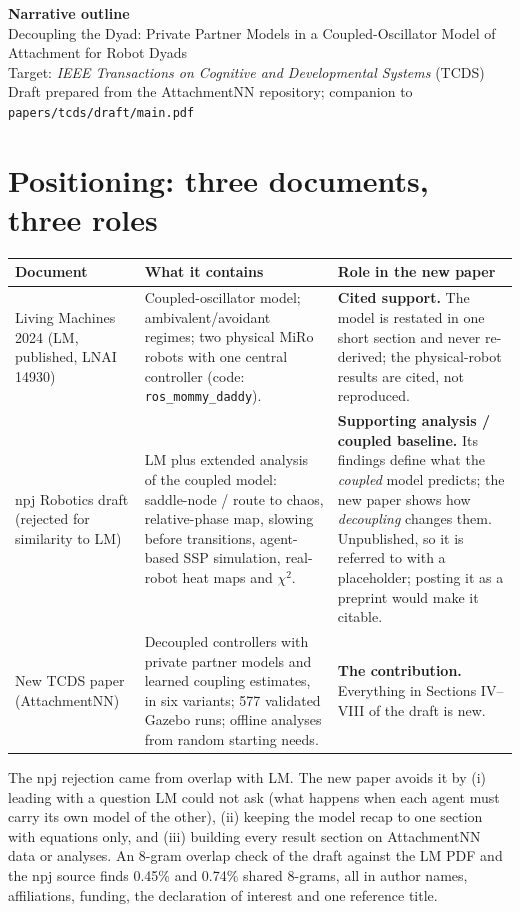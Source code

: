 \documentclass[10pt,a4paper]{article}
\begin{document}
\begin{center}
{\LARGE\bfseries Narrative outline}\\[4pt]
{\large Decoupling the Dyad: Private Partner Models in a Coupled-Oscillator Model of Attachment for Robot Dyads}\\[4pt]
Target: \emph{IEEE Transactions on Cognitive and Developmental Systems} (TCDS)\\
Draft prepared from the AttachmentNN repository; companion to \texttt{papers/tcds/draft/main.pdf}
\end{center}

\section{Positioning: three documents, three roles}

\begin{tabularx}{\textwidth}{@{}p{3.1cm}LL@{}}
\toprule
Document & What it contains & Role in the new paper \\
\midrule
Living Machines 2024 (LM, published, LNAI 14930) & Coupled-oscillator model; ambivalent/avoidant regimes; two physical MiRo robots with one central controller (code: \texttt{ros\_mommy\_daddy}). & \textbf{Cited support.} The model is restated in one short section and never re-derived; the physical-robot results are cited, not reproduced. \\
npj Robotics draft (rejected for similarity to LM) & LM plus extended analysis of the coupled model: saddle-node / route to chaos, relative-phase map, slowing before transitions, agent-based SSP simulation, real-robot heat maps and $\chi^2$. & \textbf{Supporting analysis / coupled baseline.} Its findings define what the \emph{coupled} model predicts; the new paper shows how \emph{decoupling} changes them. Unpublished, so it is referred to with a placeholder; posting it as a preprint would make it citable. \\
New TCDS paper (AttachmentNN) & Decoupled controllers with private partner models and learned coupling estimates, in six variants; 577 validated Gazebo runs; offline analyses from random starting needs. & \textbf{The contribution.} Everything in Sections IV--VIII of the draft is new. \\
\bottomrule
\end{tabularx}

The npj rejection came from overlap with LM. The new paper avoids it by (i) leading with a question LM could not ask (what happens when each agent must carry its own model of the other), (ii) keeping the model recap to one section with equations only, and (iii) building every result section on AttachmentNN data or analyses. An 8-gram overlap check of the draft against the LM PDF and the npj source finds 0.45\% and 0.74\% shared 8-grams, all in author names, affiliations, funding, the declaration of interest and one reference title.
\end{document}
